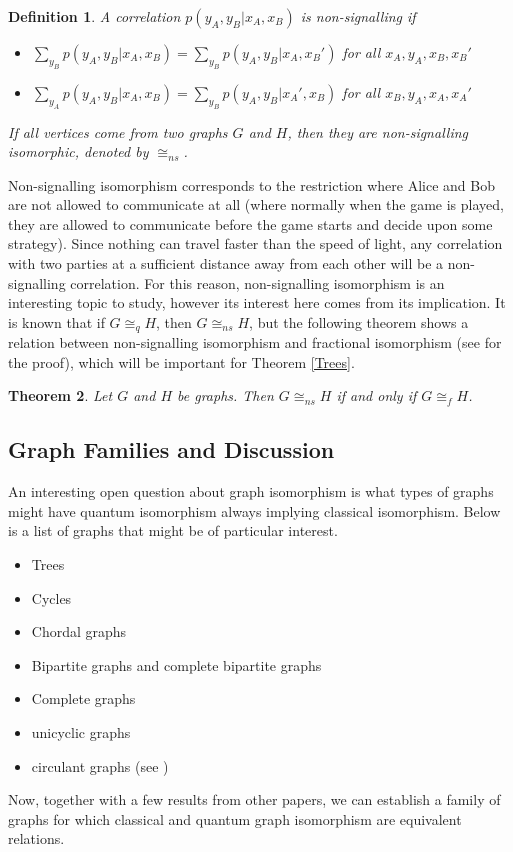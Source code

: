 \documentclass[12pt]{article}
\newtheorem{thm}{Theorem}[section]
\newtheorem{defn}[thm]{Definition}
\begin{document}
\begin{defn}
  A correlation $p(y_A, y_B | x_A, x_B)$ is non-signalling if
  \begin{itemize}
  \item $\sum_{y_B}p(y_A, y_B | x_A, x_B) = \sum_{y_B}p(y_A, y_B |
    x_A, x_B')$ for all $x_A, y_A, x_B, x_B'$
  \item $\sum_{y_A}p(y_A, y_B | x_A, x_B) = \sum_{y_B}p(y_A, y_B |
    x_A', x_B)$ for all $x_B, y_A, x_A, x_A'$
  \end{itemize}
  If all vertices come from two graphs $G$ and $H$, then they are
  non-signalling isomorphic, denoted by $\cong_{ns}$.
\end{defn}

Non-signalling isomorphism corresponds to the restriction where Alice
and Bob are not allowed to communicate at all (where normally when the
game is played, they are allowed to communicate before the game starts
and decide upon some strategy). Since nothing can travel faster than
the speed of light, any correlation with two parties at a sufficient
distance away from each other will be a non-signalling
correlation. For this reason, non-signalling isomorphism is an
interesting topic to study, however its interest here comes from its
implication. It is known that if $G \cong_q H$, then $G \cong_{ns}H$,
but the following theorem shows a relation between non-signalling
isomorphism and fractional isomorphism (see \cite{amrssv2016} for the
proof), which will be important for Theorem \ref{Trees}.

\begin{thm}
  Let $G$ and $H$ be graphs. Then $G \cong_{ns} H$ if and only if $G
  \cong_f H$.
\end{thm}

\subsection{Graph Families and Discussion}

An interesting open question about graph isomorphism is what types of
graphs might have quantum isomorphism always implying classical
isomorphism. Below is a list of graphs that might be of particular
interest.
\begin{itemize}
\item Trees
\item Cycles
\item Chordal graphs
\item Bipartite graphs and complete bipartite graphs
\item Complete graphs 
\item unicyclic graphs
\item circulant graphs (see \cite{bh2011})
\end{itemize}
Now, together with a few results from other papers, we can establish a
family of graphs for which classical and quantum graph isomorphism are
equivalent relations.
\end{document}
